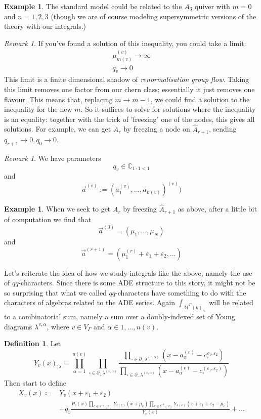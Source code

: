 \documentclass[leqno, openany]{memoir}
\theoremstyle{definition}
\newtheorem{defn}[thm]{Definition}
\newtheorem{exm}[thm]{Example}
\theoremstyle{remark}
\newtheorem{rmk}[thm]{Remark}
\theoremstyle{plain}
\theoremstyle{definition}
\theoremstyle{remark}
\newcommand{\ep}{\varepsilon}
\begin{document}
\begin{exm}
The standard model could be related to the $A_3$ quiver with $m=0$ and $n = 1,2,3$ 
(though we are of course modeling supersymmetric versions of the theory with our integrals.)
\end{exm}

\begin{rmk}  
If you've found a solution of this inequality, you could take a limit: 
\begin{align*}
\mu^{(v)}_{m(v)} \to \infty 
\\
q_v \to 0 
\end{align*}
This limit is a finite dimensional shadow of \emph{renormalisation group flow}.
Taking this limit removes one factor from our chern class; essentially it just removes one flavour.
This means that, replacing $m \to m-1$, we could find a solution to the inequality for the new $m$.
So it suffices to solve for solutions where the inequality is an equality:
together with the trick of 'freezing' one of the nodes, this gives all solutions. 
For example, we can get $A_r$ by freezing a node on $\widehat{A}_{r+1}$, sending $q_{r+1}\to0, q_0 \to 0$. 
\end{rmk}

\begin{rmk}
We have parameters 
\[
q_v \in \mathbb{C}_{1 \cdot 1 <1}
\]
and
\[
\vec{a}^{(v)} := (a_1^{(v)},\dots,a_{n(v)})^{(v)})
\]
\end{rmk}

\begin{exm}
When we seek to get $A_r$ by freezing $\widehat{A}_{r+1}$ as above, after a little bit of computation we find that 
\[
\vec{a}^{(0)} = (\mu_1,\dots,\mu_N)
\]
and
\[
\vec{a}^{(r+1)} = (\mu_1^{(r)} + \ep_1 + \ep_2,\dots)
\]
\end{exm}

Let's reiterate the idea of how we study integrals like the above, namely the use of $qq$-characters.
Since there is some ADE structure to this story, it might not be so surprising that what we called $qq$-characters 
have something to do with the characters of algebras related to the ADE series.
Again $\int_{\overline{\mathcal{M}}^\Gamma(k)_n}$ will be related to a combinatorial sum,
namely a sum over a doubly-indexed set of Young diagrams $\lambda^{v,\alpha}$, where $v \in V_\Gamma$ and $\alpha \in 1,\dots,n(v)$. 

\begin{defn}
Let 
\[
Y_v(x)_{|\lambda} = \prod_{\alpha = 1}^{n(v)} \prod_{\square \in \partial_+ \lambda^{(v,\alpha)}} \frac{\prod_{\square \in \partial_+ \lambda^{(v,\alpha)}} (x - a_\alpha^{(v)} - c_\square^{\ep_1,\ep_2})}{\prod_{\square \in \partial_- \lambda^{(v,\alpha)}} (x - a_\alpha^{(v)} - c_\square^{(\ep_1,\ep_2)})}
\]
Then start to define
\begin{align*}
    X_v(x) \coloneqq{}& Y_v(x + \ep_1 + \ep_2) \\
    &+ q_v \frac{P_v(x)\prod_{e \in s^{-1}(v)} Y_{t(e)}(x +\mu_e) \prod_{e \in t^{-1}(v)} Y_{s(e)} (x + \ep_1 + \ep_2 - \mu_e)}{Y_v(x)} + \dots 
\end{align*}
\end{defn}
\end{document}
